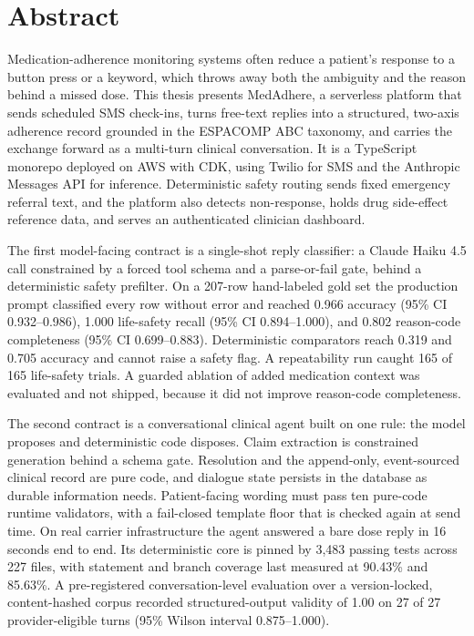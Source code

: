 \documentclass[12pt,oneside]{report}
\begin{document}
\chapter*{Abstract}
\thispagestyle{empty}
Medication-adherence monitoring systems often reduce a patient's response to a
button press or a keyword, which throws away both the ambiguity and the reason
behind a missed dose. This thesis presents MedAdhere, a serverless platform that
sends scheduled SMS check-ins, turns free-text replies into a structured,
two-axis adherence record grounded in the ESPACOMP ABC taxonomy, and carries the
exchange forward as a multi-turn clinical conversation. It is a TypeScript
monorepo deployed on AWS with CDK, using Twilio for SMS and the Anthropic
Messages API for inference. Deterministic safety routing sends fixed emergency
referral text, and the platform also detects non-response, holds drug
side-effect reference data, and serves an authenticated clinician dashboard.

The first model-facing contract is a single-shot reply classifier: a Claude
Haiku 4.5 call constrained by a forced tool schema and a parse-or-fail gate,
behind a deterministic safety prefilter. On a 207-row hand-labeled gold set the
production prompt classified every row without error and reached 0.966 accuracy
(95\% CI 0.932--0.986), 1.000 life-safety recall (95\% CI 0.894--1.000), and
0.802 reason-code completeness (95\% CI 0.699--0.883). Deterministic
comparators reach 0.319 and 0.705 accuracy and cannot raise a safety flag. A
repeatability run caught 165 of 165 life-safety trials. A guarded ablation of
added medication context was evaluated and not shipped, because it did not
improve reason-code completeness.

The second contract is a conversational clinical agent built on one rule: the
model proposes and deterministic code disposes. Claim extraction is constrained
generation behind a schema gate. Resolution and the append-only, event-sourced
clinical record are pure code, and dialogue state persists in the database as
durable information needs. Patient-facing wording must pass ten pure-code
runtime validators, with a fail-closed template floor that is checked again at
send time. On real carrier infrastructure the agent answered a bare dose reply
in 16 seconds end to end. Its deterministic core is pinned by 3{,}483 passing
tests across 227 files, with statement and branch coverage last measured at
90.43\% and 85.63\%. A pre-registered conversation-level evaluation over a
version-locked, content-hashed corpus recorded structured-output validity of
1.00 on 27 of 27 provider-eligible turns (95\% Wilson interval 0.875--1.000).
\end{document}
